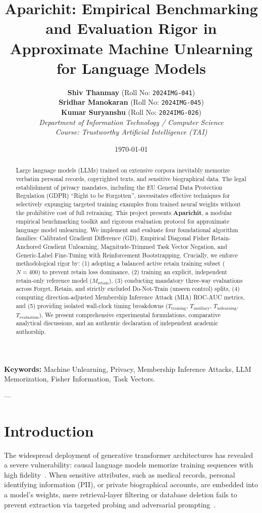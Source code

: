\documentclass[11pt,a4paper]{article}
\title{\textbf{\LARGE Aparichit: Empirical Benchmarking and Evaluation Rigor in Approximate Machine Unlearning for Language Models}}
\author{
    \textbf{Shiv Thanmay} \quad (Roll No: \texttt{2024IMG-041}) \\
    \textbf{Sridhar Manokaran} \quad (Roll No: \texttt{2024IMG-045}) \\
    \textbf{Kumar Suryanshu} \quad (Roll No: \texttt{2024IMG-026}) \\[0.8em]
    \textit{Department of Information Technology / Computer Science} \\
    \textit{Course: Trustworthy Artificial Intelligence (TAI)}
}
\date{\today}
\begin{document}
\maketitle

\begin{abstract}
Large language models (LLMs) trained on extensive corpora inevitably memorize verbatim personal records, copyrighted texts, and sensitive biographical data. The legal establishment of privacy mandates, including the EU General Data Protection Regulation (GDPR) ``Right to be Forgotten'', necessitates effective techniques for selectively expunging targeted training examples from trained neural weights without the prohibitive cost of full retraining. This project presents \textbf{Aparichit}, a modular empirical benchmarking toolkit and rigorous evaluation protocol for approximate language model unlearning. We implement and evaluate four foundational algorithm families: Calibrated Gradient Difference (GD), Empirical Diagonal Fisher Retain-Anchored Gradient Unlearning, Magnitude-Trimmed Task Vector Negation, and Generic-Label Fine-Tuning with Reinforcement Bootstrapping. Crucially, we enforce methodological rigor by: (1) adopting a balanced active retain training subset ($N=400$) to prevent retain loss dominance, (2) training an explicit, independent retain-only reference model ($M_{\text{retain}}$), (3) conducting mandatory three-way evaluations across Forget, Retain, and strictly excluded Do-Not-Train (unseen control) splits, (4) computing direction-adjusted Membership Inference Attack (MIA) ROC-AUC metrics, and (5) providing isolated wall-clock timing breakdowns ($T_{\text{training}}$, $T_{\text{auxiliary}}$, $T_{\text{unlearning}}$, $T_{\text{evaluation}}$). We present comprehensive experimental formulations, comparative analytical discussions, and an authentic declaration of independent academic authorship.
\end{abstract}

\vspace{1em}
\noindent\textbf{Keywords:} Machine Unlearning, Privacy, Membership Inference Attacks, LLM Memorization, Fisher Information, Task Vectors.

\vspace{1.5em}

---

\section{Introduction}

The widespread deployment of generative transformer architectures has revealed a severe vulnerability: causal language models memorize training sequences with high fidelity~\cite{carlini2022quantifying}. When sensitive attributes, such as medical records, personal identifying information (PII), or private biographical accounts, are embedded into a model's weights, mere retrieval-layer filtering or database deletion fails to prevent extraction via targeted probing and adversarial prompting~\cite{shi2024detecting}.
\end{document}
